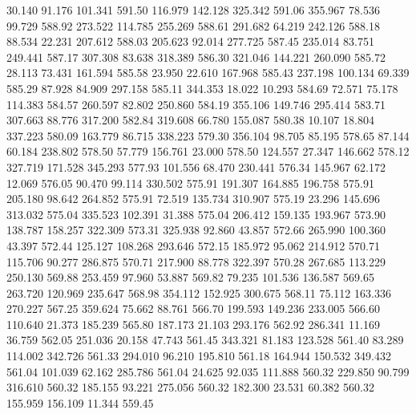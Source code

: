   30.140   91.176  101.341       591.50
 116.979  142.128  325.342       591.06
 355.967   78.536   99.729       588.92
 273.522  114.785  255.269       588.61
 291.682   64.219  242.126       588.18
  88.534   22.231  207.612       588.03
 205.623   92.014  277.725       587.45
 235.014   83.751  249.441       587.17
 307.308   83.638  318.389       586.30
 321.046  144.221  260.090       585.72
  28.113   73.431  161.594       585.58
  23.950   22.610  167.968       585.43
 237.198  100.134   69.339       585.29
  87.928   84.909  297.158       585.11
 344.353   18.022   10.293       584.69
  72.571   75.178  114.383       584.57
 260.597   82.802  250.860       584.19
 355.106  149.746  295.414       583.71
 307.663   88.776  317.200       582.84
 319.608   66.780  155.087       580.38
  10.107   18.804  337.223       580.09
 163.779   86.715  338.223       579.30
 356.104   98.705   85.195       578.65
  87.144   60.184  238.802       578.50
  57.779  156.761   23.000       578.50
 124.557   27.347  146.662       578.12
 327.719  171.528  345.293       577.93
 101.556   68.470  230.441       576.34
 145.967   62.172   12.069       576.05
  90.470   99.114  330.502       575.91
 191.307  164.885  196.758       575.91
 205.180   98.642  264.852       575.91
  72.519  135.734  310.907       575.19
  23.296  145.696  313.032       575.04
 335.523  102.391   31.388       575.04
 206.412  159.135  193.967       573.90
 138.787  158.257  322.309       573.31
 325.938   92.860   43.857       572.66
 265.990  100.360   43.397       572.44
 125.127  108.268  293.646       572.15
 185.972   95.062  214.912       570.71
 115.706   90.277  286.875       570.71
 217.900   88.778  322.397       570.28
 267.685  113.229  250.130       569.88
 253.459   97.960   53.887       569.82
  79.235  101.536  136.587       569.65
 263.720  120.969  235.647       568.98
 354.112  152.925  300.675       568.11
  75.112  163.336  270.227       567.25
 359.624   75.662   88.761       566.70
 199.593  149.236  233.005       566.60
 110.640   21.373  185.239       565.80
 187.173   21.103  293.176       562.92
 286.341   11.169   36.759       562.05
 251.036   20.158   47.743       561.45
 343.321   81.183  123.528       561.40
  83.289  114.002  342.726       561.33
 294.010   96.210  195.810       561.18
 164.944  150.532  349.432       561.04
 101.039   62.162  285.786       561.04
  24.625   92.035  111.888       560.32
 229.850   90.799  316.610       560.32
 185.155   93.221  275.056       560.32
 182.300   23.531   60.382       560.32
 155.959  156.109   11.344       559.45
